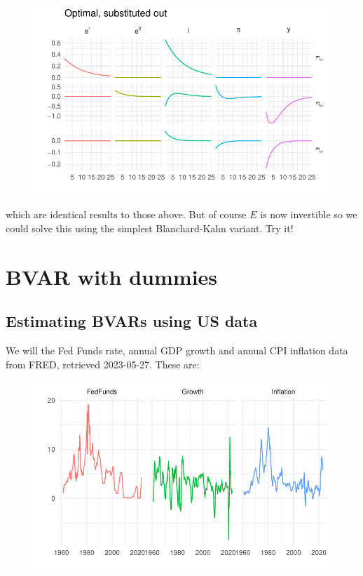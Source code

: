 \documentclass[
  letterpaper,
]{book}
\begin{document}
\begin{figure}[H]

{\centering \includegraphics{BK_files/figure-pdf/unnamed-chunk-32-1.pdf}

}

\end{figure}

which are identical results to those above. But of course \(E\) is now
invertible so we could solve this using the simplest Blanchard-Kahn
variant. Try it!

\hypertarget{bvar-with-dummies}{%
\chapter{BVAR with dummies}\label{bvar-with-dummies}}

\hypertarget{estimating-bvars-using-us-data}{%
\section{Estimating BVARs using US
data}\label{estimating-bvars-using-us-data}}

We will the Fed Funds rate, annual GDP growth and annual CPI inflation
data from FRED, retrieved 2023-05-27. These are:

\begin{figure}

{\centering \includegraphics{BVAR_files/figure-pdf/unnamed-chunk-2-1.pdf}

}

\end{figure}
\end{document}
